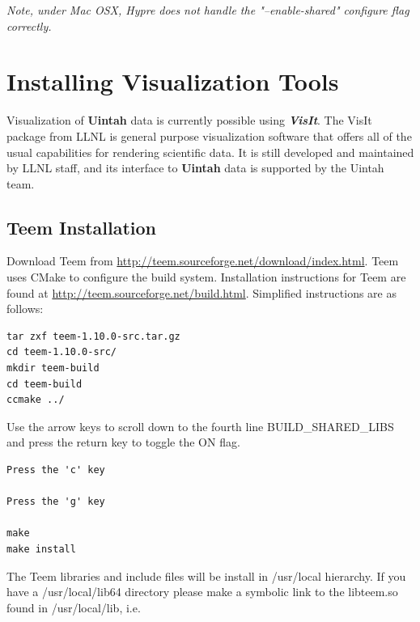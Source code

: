 \documentclass[12pt]{article}
\begin{document}
\emph{Note, under Mac OSX, Hypre does not handle the "--enable-shared" configure
  flag correctly.}

\section{Installing Visualization Tools}

Visualization of \textbf{Uintah} data is currently possible using
\textbf{\emph{VisIt}}. The VisIt package from LLNL is general purpose
visualization software that offers all of the usual capabilities for
rendering scientific data.  It is still developed and maintained by
LLNL staff, and its interface to \textbf{Uintah} data is supported by
the Uintah team.


\subsection{Teem Installation}
\label{subsec:teem}


Download Teem from
\url{http://teem.sourceforge.net/download/index.html}.  Teem uses
CMake to configure the build system. Installation instructions for
Teem are found at \url{http://teem.sourceforge.net/build.html}.  Simplified
instructions are as follows:

\begin{verbatim}
tar zxf teem-1.10.0-src.tar.gz
cd teem-1.10.0-src/
mkdir teem-build
cd teem-build
ccmake ../
\end{verbatim}

Use the arrow keys to scroll down to the fourth line
BUILD\_SHARED\_LIBS and press the return key to toggle the ON flag.

\begin{verbatim}
Press the 'c' key

Press the 'g' key

make
make install
\end{verbatim}
The Teem libraries and include files will be install in /usr/local
hierarchy.  If you have a /usr/local/lib64 directory please make a
symbolic link to the libteem.so found in /usr/local/lib, i.e.
\end{document}

